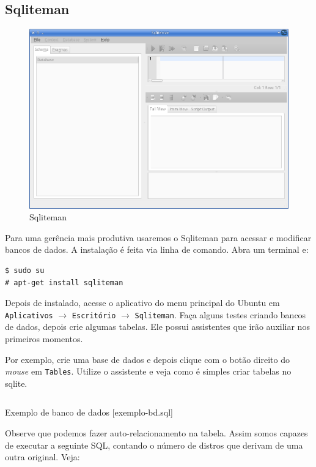 \subsection{Sqliteman}

\begin{figure}[h]
\centering
\includegraphics[scale=0.4]{img/preparando-ambiente/sqliteman.png}
\caption{Sqliteman}
\end{figure}

Para uma gerência mais produtiva usaremos o Sqliteman para acessar e
modificar bancos de dados. A instalação é feita via linha de comando.
Abra um terminal e:

\begin{verbatim}
$ sudo su
# apt-get install sqliteman
\end{verbatim}
Depois de instalado, acesse o aplicativo do menu principal do Ubuntu em
\texttt{Aplicativos} $\rightarrow$ \texttt{Escritório} $\rightarrow$
\texttt{Sqliteman}. Faça alguns testes criando bancos de dados, depois
crie algumas tabelas. Ele possui assistentes que irão auxiliar nos
primeiros momentos.

Por exemplo, crie uma base de dados e depois clique com o botão direito
do \emph{mouse} em \texttt{Tables}. Utilize o assistente e veja como é
simples criar tabelas no sqlite.

\begin{listing}[H]
  \inputminted[linenos=true,frame=bottomline,tabsize=3]{ sql }{ source/exemplo-bd-1.sql }
  \caption{Exemplo de banco de dados [exemplo-bd.sql]}
\end{listing}

Observe que podemos fazer auto-relacionamento na tabela. Assim somos
capazes de executar a seguinte SQL, contando o número de distros que
derivam de uma outra original. Veja:


